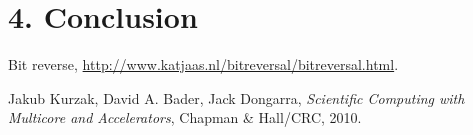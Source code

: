 \documentclass[amsmath,amssymb]{revtex4}
\begin{document}
\section{\label{sec:sec4}4. Conclusion}



\medskip

\begin{thebibliography}{9}

Bit reverse, \url{http://www.katjaas.nl/bitreversal/bitreversal.html}.

Jakub Kurzak, David A. Bader, Jack Dongarra, \textit{Scientific Computing with Multicore and Accelerators}, Chapman \& Hall/CRC, 2010.

\end{thebibliography}
\end{document}
